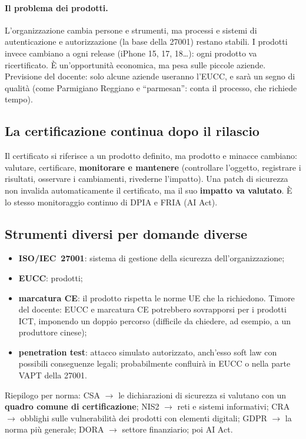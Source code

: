 \paragraph{Il problema dei prodotti.} L'organizzazione cambia persone e strumenti, ma processi e
sistemi di autenticazione e autorizzazione (la base della 27001) restano stabili. I prodotti invece
cambiano a ogni release (iPhone 15, 17, 18\ldots): ogni prodotto va ricertificato. È un'opportunità
economica, ma pesa sulle piccole aziende. Previsione del docente: solo alcune aziende useranno l'EUCC, e
sarà un segno di qualità (come Parmigiano Reggiano e ``parmesan'': conta il processo, che richiede tempo).

\subsection{La certificazione continua dopo il rilascio}
Il certificato si riferisce a un prodotto definito, ma prodotto e minacce cambiano: valutare,
certificare, \textbf{monitorare e mantenere} (controllare l'oggetto, registrare i risultati, osservare i
cambiamenti, rivederne l'impatto). Una patch di sicurezza non invalida automaticamente il certificato,
ma il suo \textbf{impatto va valutato}. È lo stesso monitoraggio continuo di DPIA e FRIA (AI Act).

\subsection{Strumenti diversi per domande diverse}
\begin{itemize}
  \item \textbf{ISO/IEC~27001}: sistema di gestione della sicurezza dell'organizzazione;
  \item \textbf{EUCC}: prodotti;
  \item \textbf{marcatura CE}: il prodotto rispetta le norme UE che la richiedono. Timore del docente:
    EUCC e marcatura CE potrebbero sovrapporsi per i prodotti ICT, imponendo un doppio percorso
    (difficile da chiedere, ad esempio, a un produttore cinese);
  \item \textbf{penetration test}: attacco simulato autorizzato, anch'esso soft law con possibili conseguenze
    legali; probabilmente confluirà in EUCC o nella parte VAPT della 27001.
\end{itemize}
Riepilogo per norma: CSA $\rightarrow$ le dichiarazioni di sicurezza si valutano con un
\textbf{quadro comune di certificazione}; NIS2 $\rightarrow$ reti e sistemi informativi; CRA
$\rightarrow$ obblighi sulle vulnerabilità dei prodotti con elementi digitali; GDPR $\rightarrow$ la norma
più generale; DORA $\rightarrow$ settore finanziario; poi AI Act.

